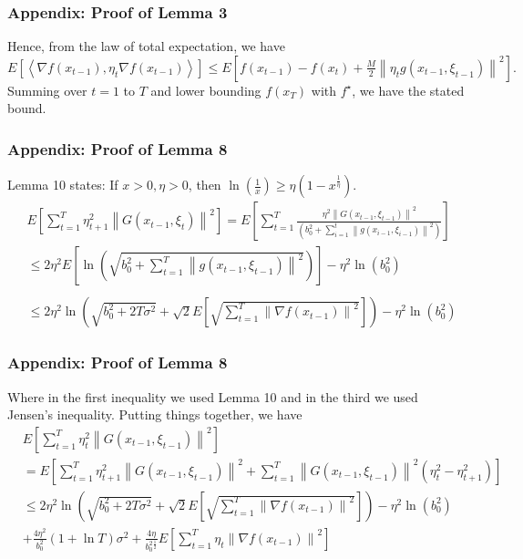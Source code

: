 \documentclass{beamer}
\begin{document}
\begin{frame}
\frametitle{Appendix: Proof of Lemma 3}
Hence, from the law of total expectation, we have
$
{E}\left[\left\langle\nabla f\left({x}_{t-1}\right), {\eta}_t \nabla f\left({x}_{t-1}\right)\right\rangle\right] \leq {E}\left[f\left({x}_{t-1}\right)-f\left({x}_{t}\right)+\frac{M}{2}\left\|{\eta}_t {g}\left({x}_{t-1}, \xi_{t-1}\right)\right\|^2\right] .
$
Summing over $t=1$ to $T$ and lower bounding $f\left({x}_{T}\right)$ with $f^{\star}$, we have the stated bound.
\end{frame}

\begin{frame}
\frametitle{Appendix: Proof of Lemma 8}
Lemma 10 states: If $x>0, \eta>0$, then $\ln (\frac{1}{x}) \geq \eta\left(1-x^{\frac{1}{\eta}}\right)$.
$$
\begin{aligned}
& {E}\left[\sum_{t=1}^T \eta_{t+1}^2\left\|{G}\left({x}_{t-1}, \xi_t\right)\right\|^2\right]={E}\left[\sum_{t=1}^T \frac{\eta^2\left\|{G}\left({x}_{t-1}, \xi_{t-1}\right)\right\|^2}{\left(b_0^2 +\sum_{i=1}^t\left\|{g}\left({x}_{i-1}, \xi_{i-1}\right)\right\|^2\right)}\right] \\
& \leq 2 \eta^2 {E}\left[\ln \left(\sqrt{b_0^2 +\sum_{t=1}^T\left\|{g}\left({x}_{t-1}, \xi_{t-1}\right)\right\|^2}\right)\right]-\eta^2 \ln \left(b_0^2\right) \\
& \\
& \leq 2 \eta^2 \ln \left(\sqrt{b_0^2 +2 T \sigma^2}+\sqrt{2} {E}\left[\sqrt{\sum_{t=1}^T\left\|\nabla f\left({x}_{t-1}\right)\right\|^2}\right]\right)-\eta^2 \ln \left(b_0^2\right)
\end{aligned}
$$
\end{frame}

\begin{frame}
\frametitle{Appendix: Proof of Lemma 8}
Where in the first inequality we used Lemma 10 and in the third we used Jensen's inequality.
Putting things together, we have
$$
\begin{aligned}
& {E}\left[\sum_{t=1}^T \eta_t^2\left\|{G}\left({x}_{t-1}, \xi_{t-1}\right)\right\|^2\right]\\&={E}\left[\sum_{t=1}^T \eta_{t+1}^2\left\|{G}\left({x}_{t-1}, \xi_{t-1}\right)\right\|^2+\sum_{t=1}^T\left\|{G}\left({x}_{t-1}, \xi_{t-1}\right)\right\|^2\left(\eta_t^2-\eta_{t+1}^2\right)\right] \\
& \leq 2 \eta^2 \ln \left(\sqrt{b_0^2 +2 T \sigma^2}+\sqrt{2} {E}\left[\sqrt{\sum_{t=1}^T\left\|\nabla f\left({x}_{t-1}\right)\right\|^2}\right]\right)-\eta^2 \ln \left(b_0^2\right)\\
&+\frac{4 \eta^2}{b_0^2 }(1+\ln T) \sigma^2+\frac{4 \eta}{b_0^2 ^{\frac{1}{2}}} {E}\left[\sum_{t=1}^T \eta_t\left\|\nabla f\left({x}_{t-1}\right)\right\|^2\right]
\end{aligned}
$$
\end{frame}
\end{document}
